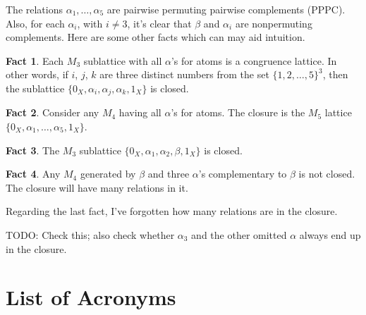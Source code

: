 \documentclass{amsart}
\theoremstyle{plain}
\theoremstyle{definition}
\newtheorem{fact}{Fact}[section]
\theoremstyle{definition}
\numberwithin{equation}{section}
\newcommand{\<}{\ensuremath{\langle}}
\renewcommand{\>}{\ensuremath{\rangle}}
\begin{document}
The relations $\alpha_1, \dots, \alpha_5$ are pairwise
permuting pairwise complements (\acs{PPPC}).  Also, for 
each $\alpha_i$, with $i\neq 3$, it's clear that $\beta$ and $\alpha_i$ are
nonpermuting complements.
Here are some other facts which can may aid intuition.
\begin{fact}
  Each $M_3$ sublattice with all $\alpha$'s for atoms is a congruence lattice.  In
  other words, if $i$, $j$, $k$ are three distinct numbers from  the set 
  $\{1,2,\dots, 5\}^3$, then the sublattice $\{0_X, \alpha_i, \alpha_j,
  \alpha_k, 1_X\}$ is closed. 
\end{fact}
\begin{fact}
Consider any $M_4$ having all $\alpha$'s for atoms.  The closure is the $M_5$
lattice $\{0_X, \alpha_1, \dots, \alpha_5, 1_X\}$.
\end{fact}
\begin{fact}
  The $M_3$ sublattice $\{0_X, \alpha_1, \alpha_2, \beta, 1_X\}$ is closed.
\end{fact}
\begin{fact}
  Any $M_4$ generated by $\beta$ and three $\alpha$'s complementary to
  $\beta$ is not closed.  The closure will have many relations in it.
\end{fact}
Regarding the last fact, I've forgotten how many relations are in the closure.

TODO: Check this; also check whether $\alpha_3$ and the other omitted $\alpha$
  always end up in the closure.

\section{List of Acronyms}
\begin{acronym}
\end{acronym}




\end{document}

